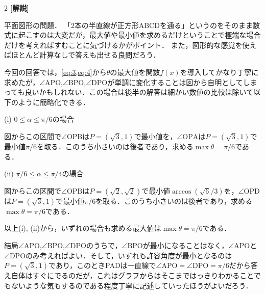 \documentclass[../../main.tex]{subfiles}
\begin{document}
\begin{multicols}{2}
  {\bf [解説]}

  平面図形の問題．
  「2本の半直線が正方形ABCDを通る」というのをそのまま数式に起こすのは大変だが，最大値や最小値を求めるだけということで極端な場合だけを考えればすむことに気づけるかがポイント．
  また，図形的な感覚を使えばほとんど計算なしで答えも出せる良問だろう．

  今回の回答では，\cref{eq:3,eq:4}から$\theta$の最大値を関数$f(x)$を導入してかなり丁寧に求めたが，$\angle \mathrm{APO}$,$\angle \mathrm{BPO}$,$\angle \mathrm{DPO}$が単調に変化することは図から自明としてしまっても良いかもしれない．この場合は後半の解答は細かい数値の比較は除いて以下のように簡略化できる．

  (i) $0 \le \alpha \le \pi/6$の場合

  図からこの区間で$\angle \mathrm{OPB}$は$P=(\sqrt{3},1)$で最小値を，$\angle \mathrm{OPA}$は$P=(\sqrt{3},1)$で最小値$\pi/6$を取る．このうち小さいのは後者であり，求める$\max\theta=\pi/6$である．

  (ii) $\pi/6 \le \alpha \le \pi/4$の場合

  図からこの区間で$\angle \mathrm{OPB}$は$P=(\sqrt{2},\sqrt{2})$で最小値$\arccos(\sqrt{6}/3)$を，$\angle \mathrm{OPD}$は$P=(\sqrt{3},1)$で最小値$\pi/6$を取る．このうち小さいのは後者であり，求める$\max\theta=\pi/6$である．

  以上(i), (ii)から，いずれの場合も求める最大値は$\max\theta=\pi/6$である．

  結局$\angle \mathrm{APO}$,$\angle \mathrm{BPO}$,$\angle \mathrm{DPO}$のうちで，$\angle \mathrm{BPO}$が最小になることはなく，$\angle \mathrm{APO}$と$\angle \mathrm{DPO}$のみ考えればよい．そして，いずれも許容角度が最小となるのは$P=(\sqrt{3},1)$であり，このときPADは一直線で$\angle \mathrm{APO}=\angle \mathrm{DPO}=\pi/6$だから答え自体はすぐにでるのだが，これはグラフからはそこまではっきりわかることでもないような気もするのである程度丁寧に記述していったほうがよいだろう．

  \begin{figure}[H]
    \centering
\end{figure}
\end{multicols}
\end{document}
